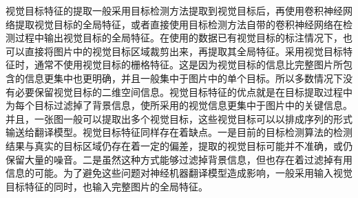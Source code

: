 视觉目标特征的提取一般采用目标检测方法提取到视觉目标后，再使用卷积神经网络提取视觉目标的全局特征，或者直接使用目标检测方法自带的卷积神经网络在检测过程中输出视觉目标的全局特征。在使用的数据已有视觉目标的标注情况下，也可以直接将图片中的视觉目标区域裁剪出来，再提取其全局特征。采用视觉目标特征时，通常不使用视觉目标的栅格特征。这是因为视觉目标的信息比完整图片所包含的信息更集中也更明确，并且一般集中于图片中的单个目标。所以多数情况下没有必要保留视觉目标的二维空间信息。视觉目标特征的优点就是在目标提取过程中为每个目标过滤掉了背景信息，使所采用的视觉信息更集中于图片中的关键信息。并且，一张图一般可以提取出多个视觉目标，这些视觉目标可以以排成序列的形式输送给翻译模型。视觉目标特征同样存在着缺点。一是目前的目标检测算法的检测结果与真实的目标区域仍存在着一定的偏差，提取的视觉目标可能并不准确，或仍保留大量的噪音。二是虽然这种方式能够过滤掉背景信息，但也存在着过滤掉有用信息的可能。为了避免这些问题对神经机器翻译模型造成影响，一般采用输入视觉目标特征的同时，也输入完整图片的全局特征。










